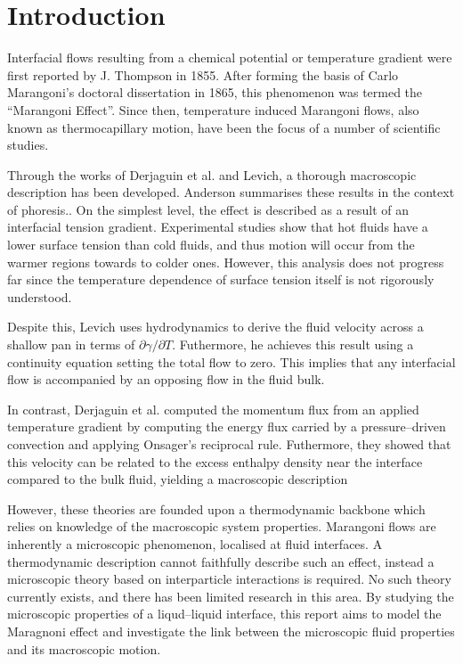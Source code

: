 \section{Introduction}
Interfacial flows resulting from a chemical potential or temperature gradient were first reported by J. Thompson in 1855.\cite{JThompson}
After forming the basis of Carlo Marangoni's doctoral dissertation in 1865, this phenomenon was termed the ``Marangoni Effect''.\cite{Marangoni}
Since then, temperature induced Marangoni flows, also known as thermocapillary motion, have been the focus of a number of scientific studies.

Through the works of Derjaguin et al.\cite{SurfaceForces} and Levich\cite{Levich}, a thorough macroscopic description has been developed.
Anderson summarises these results in the context of phoresis.\cite{Anderson}.
On the simplest level, the effect is described as a result of an interfacial tension gradient.
Experimental studies show that hot fluids have a lower surface tension than cold fluids,\cite{Ficalbi1972,Kayser1975} and thus motion will occur from the warmer regions towards to colder ones.
However, this analysis does not progress far since the temperature dependence of surface tension itself is not rigorously understood.

Despite this, Levich uses hydrodynamics to derive the fluid velocity across a shallow pan in terms of $\partial \gamma / \partial T$.
Futhermore, he achieves this result using a continuity equation setting the total flow to zero.
This implies that any interfacial flow is accompanied by an opposing flow in the fluid bulk.

In contrast, Derjaguin et al. computed the momentum flux from an applied temperature gradient by computing the energy flux carried by a pressure--driven convection and applying Onsager's reciprocal rule.\cite{SurfaceForces}
Futhermore, they showed that this velocity can be related to the excess enthalpy density near the interface compared to the bulk fluid, yielding a macroscopic description

However, these theories are founded upon a thermodynamic backbone which relies on knowledge of the macroscopic system properties.
Marangoni flows are inherently a microscopic phenomenon, localised at fluid interfaces.
A thermodynamic description cannot faithfully describe such an effect, instead a microscopic theory based on interparticle interactions is required.
No such theory currently exists, and there has been limited research in this area.\cite{HolgerBoppHampe}
By studying the microscopic properties of a liqud--liquid interface, this report aims to model the Maragnoni effect and investigate the link between the microscopic fluid properties and its macroscopic motion.

